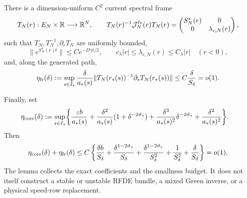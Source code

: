 \begin{lemma}
There is a dimension-uniform \(C^2\) current spectral frame
\begin{equation}
 T_N(r):E_N\times\mathbb R\longrightarrow\mathbb R^N,
 \qquad
 T_N(r)^{-1}\mathcal J_N^{\rm fv}(r)T_N(r)
 =\begin{pmatrix}S_N^s(r)&0\\0&\lambda_{c,N}(r)\end{pmatrix}, \label{eq:generated-core-current-frame}
\end{equation}
such that \(T_N,T_N^{-1},\partial_rT_N\) are uniformly bounded,
\[
 \|e^{S_N^s(r)t}\|\le Ce^{-D\gamma t/2},
 \qquad
 c_\lambda|r|\le\lambda_{c,N}(r)\le C_\lambda|r|
 \quad(r<0),
                                                               \label{eq:generated-core-current-block-rates}
\]
and, along the generated path,
\begin{equation}
 \eta_{\rm fr}(\delta)
 :=\sup_{s\in I_*}
   \frac{\delta}{a_*(s)}
   \|T_N(r_*(s))^{-1}\partial_sT_N(r_*(s))\|
 \le C\frac{\delta}{S_\delta}=o(1).             \label{eq:generated-core-frame-number}
\end{equation}

Finally, set
\begin{align}
 \eta_{\rm core}(\delta)
 :=\sup_{s\in I_*}\biggl\{
 &\frac{\varepsilon b}{a_*(s)}
 +\frac{\delta^2}{a_*(s)}
       (1+\delta^{-2\vartheta_*})
 +\frac{\delta^3}{a_*(s)^2}\delta^{-2\vartheta_*}
 +\frac{\delta^2}{a_*(s)^2}\biggr\}.             \label{eq:generated-core-contraction-number}
\end{align}
Then
\begin{equation}
 \eta_{\rm core}(\delta)+\eta_{\rm fr}(\delta)
 \le C\left\{
    \frac{\delta b}{S_\delta}
   +\frac{\delta^{1-2\vartheta_*}}{S_\delta}
   +\frac{\delta^{1-2\vartheta_*}}{S_\delta^2}
   +\frac1{S_\delta^2}
   +\frac{\delta}{S_\delta}\right\}
 =o(1).                                          \label{eq:generated-core-contraction-closes}
\end{equation}
The lemma collects the exact coefficients and the smallness budget.  It
does not itself construct a stable or unstable RFDE bundle, a mixed Green
inverse, or a physical speed-row replacement.
\end{lemma}

